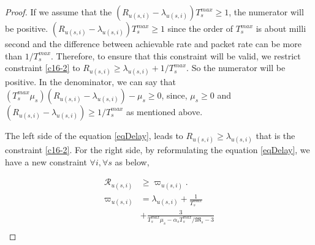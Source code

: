 \documentclass[conference]{IEEEtran}
\begin{document}
\begin{proof}
If we assume that the $(R_{u(s,i)}-\lambda_{u(s,i)})T^{max}_s \geq 1$, the numerator will be positive.
$(R_{u(s,i)}-\lambda_{u(s,i)})T^{max}_s \geq 1$ since the order of $T^{max}_s$ is about milli second and the difference between achievable rate and packet rate can be more than $1/T^{max}_s$.
Therefore, to ensure that this constraint will be valid, we restrict constraint \eqref{c16-2} to $R_{u(s,i)} \geq \lambda_{u(s,i)} + 1/T^{max}_s$.
So the numerator will be positive.
In the denominator, we can say that $(T^{max}_s\mu_s)(R_{u(s,i)}-\lambda_{u(s,i)}) - \mu_s \geq 0 $, since,  
$\mu_s \geq 0$ and
$(R_{u(s,i)}-\lambda_{u(s,i)}) \geq 1/T^{max}_s$ as mentioned above.

The left side of the equation \eqref{eqDelay}, leads to $R_{u(s,i)} \geq \lambda_{u(s,i)}$ that is the constraint \eqref{c16-2}. 
For the right side, by reformulating the equation \eqref{eqDelay}, we have a new constraint $\forall i, \forall s$ as below,

\begin{equation}\label{RM}
\begin{split}
\mathcal{R}_{u(s,i)} &\geq \varpi_{u(s,i)}. \\
\varpi_{u(s,i)} &= \lambda_{u(s,i)} + \frac{1}{T^{max}_s}\\
& + \frac{3}{T^{max}_s\mu_s-\alpha_s T^{max}_s/\mathfrak{M}_s-3}\\
\end{split}
\end{equation}


\end{proof}
\end{document}
